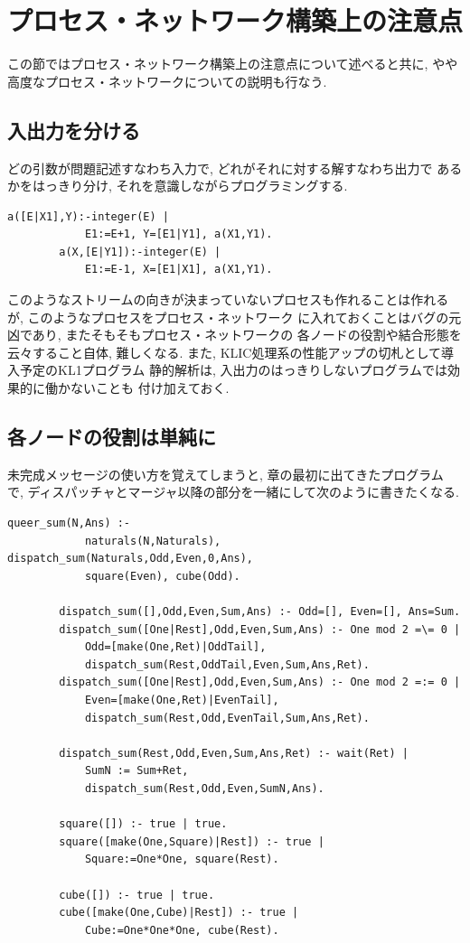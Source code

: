 \documentclass[a4,titlepage]{jsreport}
\newenvironment{program}{\begin{quote}}{\end{quote}}
\begin{document}
\section{プロセス・ネットワーク構築上の注意点}
この節ではプロセス・ネットワーク構築上の注意点について述べると共に, 
やや高度なプロセス・ネットワークについての説明も行なう.  

\subsection{入出力を分ける}
どの引数が問題記述すなわち入力で, どれがそれに対する解すなわち出力で
あるかをはっきり分け, それを意識しながらプログラミングする.  

\begin{Verbatim}[baselinestretch=0.8]
        a([E|X1],Y):-integer(E) |
            E1:=E+1, Y=[E1|Y1], a(X1,Y1).
        a(X,[E|Y1]):-integer(E) |
            E1:=E-1, X=[E1|X1], a(X1,Y1).
\end{Verbatim}

このようなストリームの向きが決まっていないプロセスも作れることは作れるが, 
このようなプロセスをプロセス・ネットワーク
に入れておくことはバグの元凶であり, またそもそもプロセス・ネットワークの
各ノードの役割や結合形態を云々すること自体, 難しくなる.  
また, KLIC処理系の性能アップの切札として導入予定のKL1プログラム
静的解析は, 入出力のはっきりしないプログラムでは効果的に働かないことも
付け加えておく.  

\subsection{各ノードの役割は単純に}
未完成メッセージの使い方を覚えてしまうと, 章の最初に出てきたプログラム
で, ディスパッチャとマージャ以降の部分を一緒にして次のように書きたくなる.  

\begin{Verbatim}[baselinestretch=0.8]
        queer_sum(N,Ans) :-
            naturals(N,Naturals), dispatch_sum(Naturals,Odd,Even,0,Ans),
            square(Even), cube(Odd).
        
        dispatch_sum([],Odd,Even,Sum,Ans) :- Odd=[], Even=[], Ans=Sum.
        dispatch_sum([One|Rest],Odd,Even,Sum,Ans) :- One mod 2 =\= 0 |
            Odd=[make(One,Ret)|OddTail],
            dispatch_sum(Rest,OddTail,Even,Sum,Ans,Ret).
        dispatch_sum([One|Rest],Odd,Even,Sum,Ans) :- One mod 2 =:= 0 |
            Even=[make(One,Ret)|EvenTail],
            dispatch_sum(Rest,Odd,EvenTail,Sum,Ans,Ret).

        dispatch_sum(Rest,Odd,Even,Sum,Ans,Ret) :- wait(Ret) |
            SumN := Sum+Ret,
            dispatch_sum(Rest,Odd,Even,SumN,Ans).

        square([]) :- true | true.
        square([make(One,Square)|Rest]) :- true |
            Square:=One*One, square(Rest).

        cube([]) :- true | true.
        cube([make(One,Cube)|Rest]) :- true |
            Cube:=One*One*One, cube(Rest).
\end{Verbatim}
\end{document}
